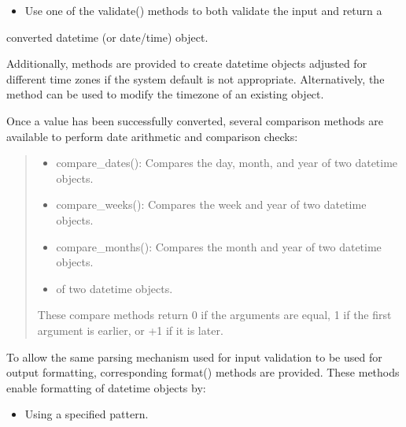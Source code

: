 \documentclass[letterpaper,10pt,english]{sphinxmanual}
\begin{document}
\begin{fulllineitems}
\begin{description}
\begin{itemize}
\item {} 
\sphinxAtStartPar
Use one of the validate() methods to both validate the input and return a

\end{itemize}

\sphinxAtStartPar
converted datetime (or date/time) object.

\end{description}

\sphinxAtStartPar
Additionally, methods are provided to create datetime objects adjusted for
different time zones if the system default is not appropriate. Alternatively,
the  method can be used to modify the timezone of an
existing  object.

\sphinxAtStartPar
Once a value has been successfully converted, several comparison methods are
available to perform date arithmetic and comparison checks:
\begin{quote}
\begin{itemize}
\item {} 
\sphinxAtStartPar
compare\_dates(): Compares the day, month, and year of two datetime objects.

\item {} 
\sphinxAtStartPar
compare\_weeks(): Compares the week and year of two datetime objects.

\item {} 
\sphinxAtStartPar
compare\_months(): Compares the month and year of two datetime objects.

\item {} \begin{description}
\sphinxAtStartPar
of two datetime objects.

\end{description}

\end{itemize}

\sphinxAtStartPar
These compare methods return 0 if the arguments are equal, \sphinxhyphen{}1 if the first
argument is earlier, or +1 if it is later.
\end{quote}

\sphinxAtStartPar
To allow the same parsing mechanism used for input validation to be
used for output formatting, corresponding format() methods are provided. These
methods enable formatting of datetime objects by:
\begin{itemize}
\item {} 
\sphinxAtStartPar
Using a specified pattern.


\end{itemize}
\end{fulllineitems}
\end{document}
